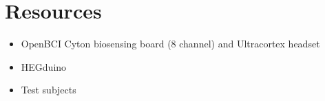 \documentclass{IEEEtran}
\begin{document}
\section{Resources}

\begin{itemize}
  \item OpenBCI Cyton biosensing board (8 channel) and Ultracortex headset
  \item HEGduino
  \item Test subjects
\end{itemize}

\bibbysegment{}

\nocite{*}
  {\list{}
     {\setlength{\leftmargin}{\bibhang}%
      \setlength{\itemindent}{-\leftmargin}%
      \setlength{\itemsep}{\bibitemsep}%
      \setlength{\parsep}{\bibparsep}}
  }
  {\endlist}
  {\item}
\printbibliography[notcategory=cited, env=bibnonum, heading=notcited]
\end{document}
